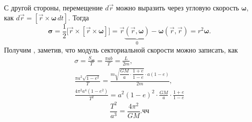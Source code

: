 С другой стороны, перемещение $d\vec{r}$ можно выразить через угловую скорость $\boldsymbol{\omega}$, как $d \vec{r} = [\vec{r} \times \boldsymbol{\omega}\,dt]$. Тогда
\begin{equation*}
	\boldsymbol{\sigma}
	= \frac{1}{2} \big[ \vec{r} \times [\vec{r} \times \boldsymbol{\omega} ]\big]
	= \vec{r} \underbrace{(\vec{r}, \boldsymbol{\omega})}_0 - \boldsymbol{\omega} ( \vec{r}, \vec{r} )
	= r^2 \boldsymbol{\omega}.
\end{equation*}
Получим , заметив, что модуль секториальной скорости можно записать, как
\begin{gather*}
	\sigma
	= \frac{S_\text{эл}}{T}
	= \frac{\pi a b}{T}
	= \frac{L}{2m},\\
	\frac{\pi a^2 \sqrt{1 - e^2}}{T}
	= \frac{m \sqrt{\dfrac{GM}{a} \cdot \dfrac{1 + e}{1 - e}} \cdot a(1-e)}{2m},\\
	\frac{4\pi^2 a^4 (1 - e^2)}{T^2}
	= a^2(1-e)^2 \cdot \frac{GM}{a} \cdot \frac{1 + e}{1-e}
\end{gather*}
\begin{equation}
	\frac{T^2}{a^3} = \frac{4\pi^2}{GM}.чч
\end{equation}


